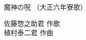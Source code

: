 \documentclass[10pt,b5j]{tarticle} %
\begin{document}
\begin{minipage}[c]{0.7\hsize} %
    \begin{center}
        {\LARGE
            魔神の呪 %
        }
        {\small 
            （大正六年寮歌） %
        }
    \end{center}
\end{minipage}
\begin{minipage}[c]{0.3\hsize} %
    \begin{flushright} %
        佐藤惣之助君 作歌\\植村泰二君 作曲 %
    \end{flushright}
\end{minipage}
\end{document}
